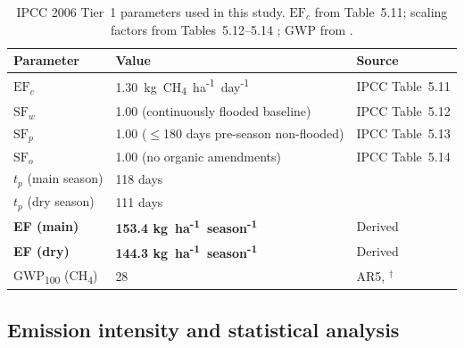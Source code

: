 \documentclass[fleqn,10pt]{olplainarticle}
\begin{document}
\begin{table}[!htbp]
\centering
\caption{IPCC 2006 Tier~1 parameters used in this study.
         $\text{EF}_c$ from Table~5.11; scaling factors from Tables~5.12--5.14
         \citep{ipcc2006}; GWP from \cite{myhre2013}.}
\label{tab:ef}
\begin{tabular}{@{}lll@{}}
\toprule
\textbf{Parameter} & \textbf{Value} & \textbf{Source} \\
\midrule
$\text{EF}_c$ & 1.30~kg~CH\textsubscript{4}~ha\textsuperscript{-1}~day\textsuperscript{-1} & IPCC Table~5.11 \\
$\text{SF}_w$ & 1.00 (continuously flooded baseline) & IPCC Table~5.12 \\
$\text{SF}_p$ & 1.00 ($\leq$180 days pre-season non-flooded) & IPCC Table~5.13 \\
$\text{SF}_o$ & 1.00 (no organic amendments) & IPCC Table~5.14 \\
\midrule
$t_p$ (main season)  & 118 days & \cite{buddhaboon2011} \\
$t_p$ (dry season)   & 111 days & \cite{buddhaboon2011} \\
\textbf{EF (main)} & \textbf{153.4 kg~ha\textsuperscript{-1}~season\textsuperscript{-1}} & Derived \\
\textbf{EF (dry)}  & \textbf{144.3 kg~ha\textsuperscript{-1}~season\textsuperscript{-1}} & Derived \\
GWP\textsubscript{100} (CH\textsubscript{4}) & 28 & AR5, \cite{myhre2013}$^{\dagger}$ \\
\bottomrule
\end{tabular}
\end{table}

\subsection*{Emission intensity and statistical analysis}
\end{document}
